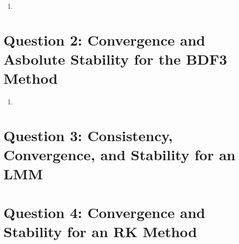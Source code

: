 \documentclass{article}
\begin{document}
\begin{enumerate}[label=\alph*)]
\begin{proof}
      \begin{align}
        \pi(z) = p(z) - \dt\lambda_i\sigma(z) = 0\\
        p(z) = \sum_{j=0}^{q} \alpha_j z^j, \quad 
        \sigma(z) = \sum_{j=0}^{q} \beta_j z^j
      \end{align}   
      We solve $(9)$ twice in order, once for each eigenvalue of our original
      linear transformation, $A$. The exact polynomial becomes,
      \begin{align}
        z^3 - z^2 -\frac{dt\lambda}{12}\left(\frac{5}{12} - \frac{16}{12}z +
        \frac{23}{12}z^2\right) &= 0\\
        z^3 - z^2\left(1 + \frac{23\dt\lambda}{12}\right) +
        \frac{16\dt\lambda}{12}z - \frac{5\dt\lambda}{12} &= 0
        \end{align}
        \begin{align}
        \begin{split}
         z^3 - z^2\left(1 + \frac{23\dt(-0.9667)}{12}\right) +
        \frac{16\dt(-0.9667)}{12}z - \frac{5\dt(-0.9667)}{12} &= 0\\
          z^3 - z^2\left(1 + \frac{23\dt(-99.0667)}{12}\right) +
        \frac{16\dt(-99.0667)}{12}z - \frac{5\dt(-99.0667)}{12} &= 0
        \end{split}
      \end{align}
    \end{proof}
  \item 

\end{enumerate}


\section*{Question 2: Convergence and Asbolute Stability for the BDF3 Method}


\begin{enumerate}[label=\alph*)]

  \item       

\end{enumerate}
\section*{Question 3: Consistency, Convergence, and Stability for an LMM}

\section*{Question 4: Convergence and Stability for an RK Method}
\end{document}
